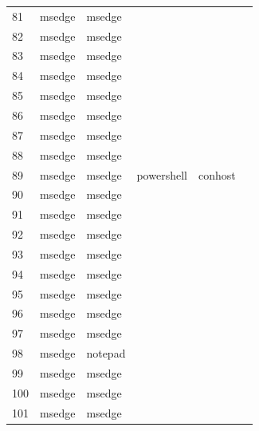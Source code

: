 \documentclass[a4paper,twoside,12pt]{book}
\begin{document}
\begin{appendices}
\begin{table}
\begin{tabular}{llllll}
		81  &  msedge &         msedge &                &                &                \\
		82  &  msedge &         msedge &                &                &                \\
		83  &  msedge &         msedge &                &                &                \\
		84  &  msedge &         msedge &                &                &                \\
		85  &  msedge &         msedge &                &                &                \\
		86  &  msedge &         msedge &                &                &                \\
		87  &  msedge &         msedge &                &                &                \\
		88  &  msedge &         msedge &                &                &                \\
		89  &  msedge &         msedge &     powershell &        conhost &                \\
		90  &  msedge &         msedge &                &                &                \\
		91  &  msedge &         msedge &                &                &                \\
		92  &  msedge &         msedge &                &                &                \\
		93  &  msedge &         msedge &                &                &                \\
		94  &  msedge &         msedge &                &                &                \\
		95  &  msedge &         msedge &                &                &                \\
		96  &  msedge &         msedge &                &                &                \\
		97  &  msedge &         msedge &                &                &                \\
		98  &  msedge &        notepad &                &                &                \\
		99  &  msedge &         msedge &                &                &                \\
		100 &  msedge &         msedge &                &                &                \\
		101 &  msedge &         msedge &                &                &                \\

\end{tabular}
\end{table}
\end{appendices}
\end{document}
